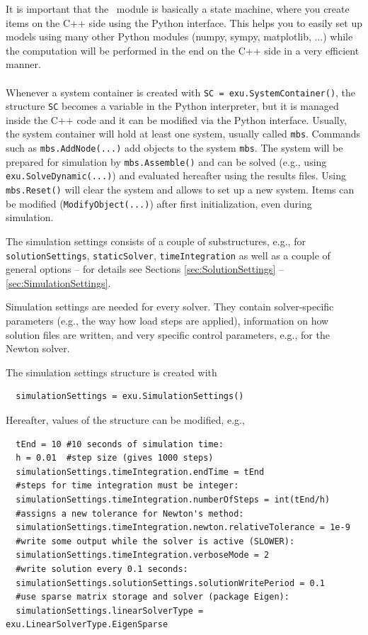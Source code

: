 It is important that the \codeName\ module is basically a state machine, where you create items on the C++ side using the Python interface. This helps you to easily set up models using many other Python modules (numpy, sympy, matplotlib, ...) while the computation will be performed in the end on the C++ side in a very efficient manner. 
\vspace{12pt}\\
\vspace{6pt}\\
Whenever a system container is created with \texttt{SC = exu.SystemContainer()}, the structure \texttt{SC} becomes a variable in the Python interpreter, but it is managed inside the C++ code and it can be modified via the Python interface.
Usually, the system container will hold at least one system, usually called \texttt{mbs}.
Commands such as \texttt{mbs.AddNode(...)} add objects to the system \texttt{mbs}. 
The system will be prepared for simulation by \texttt{mbs.Assemble()} and can be solved (e.g., using \texttt{exu.SolveDynamic(...)}) and evaluated hereafter using the results files.
Using \texttt{mbs.Reset()} will clear the system and allows to set up a new system. Items can be modified (\texttt{ModifyObject(...)}) after first initialization, even during simulation.
%

The simulation settings consists of a couple of substructures, e.g., for \texttt{solutionSettings}, \texttt{staticSolver}, \texttt{timeIntegration} as well as a couple of general options -- for details see Sections \ref{sec:SolutionSettings} -- \ref{sec:SimulationSettings}.

Simulation settings are needed for every solver. They contain solver-specific parameters (e.g., the way how load steps are applied), information on how solution files are written, and very specific control parameters, e.g., for the Newton solver. 

\noindent The simulation settings structure is created with 
\pythonstyle\begin{lstlisting}
  simulationSettings = exu.SimulationSettings()
\end{lstlisting}
%
Hereafter, values of the structure can be modified, e.g.,
\pythonstyle\begin{lstlisting}
  tEnd = 10 #10 seconds of simulation time:
  h = 0.01  #step size (gives 1000 steps)
  simulationSettings.timeIntegration.endTime = tEnd
  #steps for time integration must be integer:
  simulationSettings.timeIntegration.numberOfSteps = int(tEnd/h)
  #assigns a new tolerance for Newton's method:
  simulationSettings.timeIntegration.newton.relativeTolerance = 1e-9 
  #write some output while the solver is active (SLOWER):
  simulationSettings.timeIntegration.verboseMode = 2                 
  #write solution every 0.1 seconds:
  simulationSettings.solutionSettings.solutionWritePeriod = 0.1      
  #use sparse matrix storage and solver (package Eigen):
  simulationSettings.linearSolverType = exu.LinearSolverType.EigenSparse 
\end{lstlisting}

